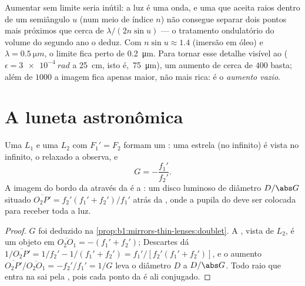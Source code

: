 \begin{remark}\label{rem:b1:optical-instruments:abbe}
Aumentar sem limite seria inútil: a luz é uma onda, e uma
 que aceita raios dentro de um semiângulo $u$ (num meio de índice
$n$) não consegue separar dois pontos mais próximos que cerca de
$\lambda/(2n\sin u)$ --- o tratamento ondulatório do volume do segundo ano o
deduz. Com $n\sin u \approx 1.4$ (imersão em óleo) e $\lambda =
\qty{0.5}{\micro m}$, o limite fica perto de \qty{0.2}{\micro m}. Para tornar
esse detalhe visível ao  ($\epsilon = \qty{3e-4}{rad}$ a
\qty{25}{cm}, isto é,\ \qty{75}{\micro m}), um aumento de cerca de $400$
basta; além de $1000$ a imagem fica apenas maior, não mais rica:
é o \emph{aumento vazio}.
\end{remark}

\section{A luneta astronômica}

\begin{proposition}\label{prop:b1:optical-instruments:telescope}
Uma  $L_1$ e uma  $L_2$ com $F_1' = F_2$ formam um
: uma estrela (no infinito) é vista no infinito, o 
relaxado a observa, e
\[
G = -\frac{f_1'}{f_2'} .
\]
A imagem do bordo da  através da  é a
\emph{}: um disco luminoso de diâmetro $D/\abs G$ situado
$\overline{O_2P'} = f_2'(f_1' + f_2')/f_1'$ atrás da , onde
a pupila do  deve ser colocada para receber toda a luz.
\end{proposition}

\begin{proof}
$G$ foi deduzido na \cref{prop:b1:mirrors-thin-lenses:doublet}. A
, vista de $L_2$, é um objeto em $\overline{O_2O_1} = -(f_1'
+ f_2')$; Descartes dá $1/\overline{O_2P'} = 1/f_2' - 1/(f_1' + f_2')
= f_1'/[f_2'(f_1' + f_2')]$, e o aumento $\overline{O_2P'}/
\overline{O_2O_1} = -f_2'/f_1' = 1/G$ leva o diâmetro $D$ a
$D/\abs G$. Todo raio que entra na  sai pela , pois cada ponto da  é ali conjugado.
\end{proof}

